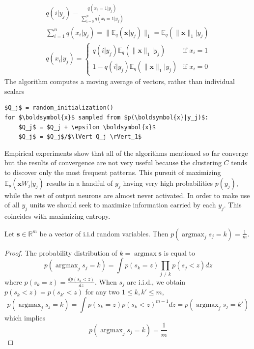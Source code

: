 \documentclass[oneside,english,logo]{amuthesis}
\DeclareMathOperator*{\argmax}{argmax}
\begin{document}
\begin{gather*}
	q(i|y_j) = \frac{q(x_i=1|y_j)}{\sum_{ï=0}^n{q(x_{ï}=1|y_j)}} \\
	\sum_{i=1}^n q(x_{i}|y_j) =  \lVert \mathbb{E}_q( \boldsymbol{x}|y_j) \rVert_1 = \mathbb{E}_q(\lVert \boldsymbol{x} \rVert_1|y_j) \\
	q(x_i|y_j) = \begin{cases}
		q(i|y_j)\mathbb{E}_q(\lVert \boldsymbol{x} \rVert_1|y_j)&\text{if }x_i=1 \\
		1-q(i|y_j)\mathbb{E}_q(\lVert \boldsymbol{x} \rVert_1|y_j)&\text{if }x_i=0 
	\end{cases}
\end{gather*}
The algorithm computes a moving average of vectors, rather than individual scalars
\begin{lstlisting}
$Q_j$ = random_initialization()
for $\boldsymbol{x}$ sampled from $p(\boldsymbol{x}|y_j)$:
    $Q_j$ = $Q_j + \epsilon \boldsymbol{x}$ 
    $Q_j$ = $Q_j$/$\lVert Q_j \rVert_1$
\end{lstlisting}
\fi
Empirical experiments show that all of the algorithms mentioned so far converge but the results of convergence are not very useful because the clustering $C$ tends to discover only the most frequent patterns. This pursuit of maximizing $\mathbb{E}_p(\boldsymbol{x}W_j|y_j)$ results in a handful of $y_j$ having very high probabilities $p(y_j)$, while the rest of output neurons are almost never activated. In order to make use of all $y_j$ units we should seek to maximize information carried by each $y_j$. This coincides with maximizing entropy.

\iffalse
\begin{theorem}
Let $\boldsymbol{s} \in \mathbb{R}^m$ be a vector of i.i.d random variables. Then $p(\argmax_j s_j=k) = \frac{1}{m}$. 
\end{theorem}
\begin{proof}
The probability distribution of $k = \argmax \boldsymbol{s}$ is equal to
	\[
	p(\argmax_j s_j=k) = \int p(s_k=z)\prod_{j\ne k} p(s_j < z) dz 
	\]
	where $p(s_k=z)=\frac{d p(s_k<z)}{d z}$. When $s_j$ are i.i.d., we obtain $p(s_{k}<z)=p(s_{k'}<z)$ for any two $1\le k,k' \le m$,
	\[
	p(\argmax_j s_j=k) = \int p(s_{k}=z) p(s_{k} < z)^{m-1} dz = p(\argmax_j s_j=k')
	\]
	which implies
	\[
	p(\argmax_j s_j=k) = \frac{1}{m}
	\]
\end{proof}
\end{document}

